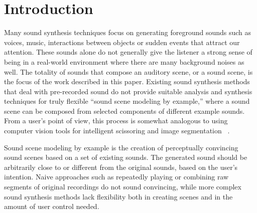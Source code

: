 \documentclass[review]{acmsiggraph}      %
\begin{document}

\section{Introduction}
Many sound synthesis techniques focus on generating foreground sounds 
such as voices, music, interactions between objects or sudden events that 
attract our attention. These sounds alone do not generally give the listener 
a strong sense of being in a real-world environment where there are many 
background noises as well. The totality of sounds that compose an auditory 
scene, or a sound scene, is the focus of the work described in this paper.  
Existing sound synthesis methods that deal with pre-recorded sound do not 
provide suitable analysis and synthesis techniques for truly flexible ``sound 
scene modeling by example,'' where a sound scene can be composed from selected 
components of different example sounds. 
From a user's point of view, this process is somewhat analogous to 
using computer vision tools for intelligent scissoring and image 
segmentation ~\cite{Mortensen95,Rother04,Wang05}.

Sound scene modeling by example is the creation of perceptually convincing 
sound scenes based on a set of existing sounds. The generated sound  
should be arbitrarily close to or different from the original sounds, based on 
the user's intention. Naive approaches such as repeatedly playing or combining 
raw segments of original recordings do not sound convincing, while more complex 
sound synthesis methods lack flexibility both in creating scenes and in the 
amount of user control needed.
\end{document}
